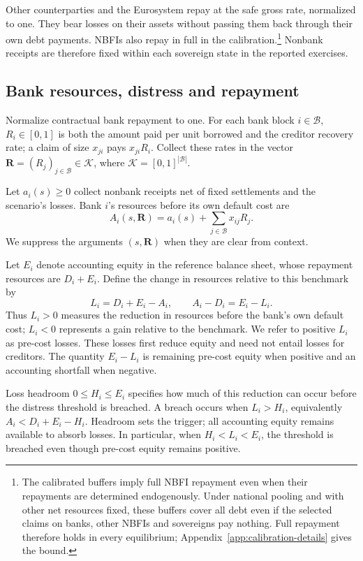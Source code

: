 Other counterparties and the Eurosystem repay at the safe gross rate, normalized to one. They bear losses on their assets without passing them back through their own debt payments. NBFIs also repay in full in the calibration.\footnote{The calibrated buffers imply full NBFI repayment even when their repayments are determined endogenously. Under national pooling and with other net resources fixed, these buffers cover all debt even if the selected claims on banks, other NBFIs and sovereigns pay nothing. Full repayment therefore holds in every equilibrium; Appendix~\ref{app:calibration-details} gives the bound.} Nonbank receipts are therefore fixed within each sovereign state in the reported exercises.

\subsection{Bank resources, distress and repayment}\label{sec:model_banks}

Normalize contractual bank repayment to one. For each bank block $i\in\mathcal B$, $R_i\in[0,1]$ is both the amount paid per unit borrowed and the creditor recovery rate; a claim of size $x_{ji}$ pays $x_{ji}R_i$. Collect these rates in the vector $\mathbf{R}=(R_j)_{j\in\mathcal B}\in\mathcal K$, where $\mathcal K=[0,1]^{|\mathcal B|}$.

Let $a_i(s)\geq0$ collect nonbank receipts net of fixed settlements and the scenario's losses. Bank $i$'s resources before its own default cost are
\[
 A_i(s,\mathbf{R})=a_i(s)+\sum_{j\in\mathcal B}x_{ij}R_j.
\]
We suppress the arguments $(s,\mathbf{R})$ when they are clear from context.

Let $E_i$ denote accounting equity in the reference balance sheet, whose repayment resources are $D_i+E_i$. Define the change in resources relative to this benchmark by
\[
 L_i=D_i+E_i-A_i,
 \qquad A_i-D_i=E_i-L_i.
\]
Thus $L_i>0$ measures the reduction in resources before the bank's own default cost; $L_i<0$ represents a gain relative to the benchmark. We refer to positive $L_i$ as pre-cost losses. These losses first reduce equity and need not entail losses for creditors. The quantity $E_i-L_i$ is remaining pre-cost equity when positive and an accounting shortfall when negative.

Loss headroom $0\leq H_i\leq E_i$ specifies how much of this reduction can occur before the distress threshold is breached. A breach occurs when $L_i>H_i$, equivalently $A_i<D_i+E_i-H_i$. Headroom sets the trigger; all accounting equity remains available to absorb losses. In particular, when $H_i<L_i<E_i$, the threshold is breached even though pre-cost equity remains positive.

